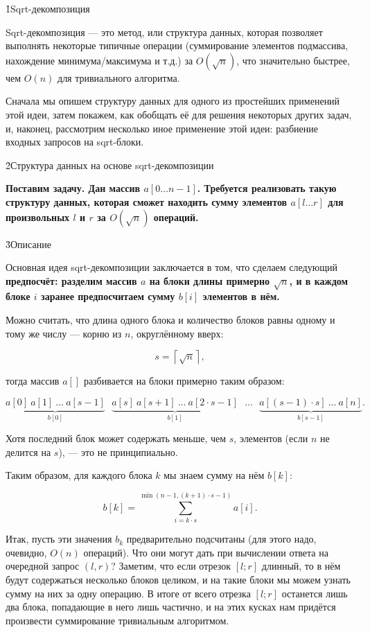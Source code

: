 \h1{Sqrt-декомпозиция}

Sqrt-декомпозиция --- это метод, или структура данных, которая позволяет выполнять некоторые типичные операции (суммирование элементов подмассива, нахождение минимума/максимума и т.д.) за $O(\sqrt{n})$, что значительно быстрее, чем $O(n)$ для тривиального алгоритма.

Сначала мы опишем структуру данных для одного из простейших применений этой идеи, затем покажем, как обобщать её для решения некоторых других задач, и, наконец, рассмотрим несколько иное применение этой идеи: разбиение входных запросов на sqrt-блоки.


\h2{Структура данных на основе sqrt-декомпозиции}

\bf{Поставим задачу}. Дан массив $a[0 \ldots n-1]$. Требуется реализовать такую структуру данных, которая сможет находить сумму элементов $a[l \ldots r]$ для произвольных $l$ и $r$ за $O(\sqrt{n})$ операций.


\h3{Описание}

Основная идея sqrt-декомпозиции заключается в том, что сделаем следующий \bf{предпосчёт}: разделим массив $a$ на блоки длины примерно $\sqrt{n}$, и в каждом блоке $i$ заранее предпосчитаем сумму $b[i]$ элементов в нём.

Можно считать, что длина одного блока и количество блоков равны одному и тому же числу --- корню из $n$, округлённому вверх:

$$ s = \left\lceil \sqrt{n} \right\rceil, $$

тогда массив $a[]$ разбивается на блоки примерно таким образом:

$$ \underbrace{ a[0] ~ a[1] ~ \ldots ~ a[s-1] }_{b[0]} ~~~ \underbrace{ a[s] ~ a[s+1] ~ \ldots ~ a[2 \cdot s-1] }_{b[1]} ~~~ \ldots ~~~ \underbrace{ a[(s-1) \cdot s] ~ \ldots ~ a[n] }_{b[s-1]}. $$

Хотя последний блок может содержать меньше, чем $s$, элементов (если $n$ не делится на $s$), --- это не принципиально.

Таким образом, для каждого блока $k$ мы знаем сумму на нём $b[k]$:

$$ b[k] = \sum_{i=k \cdot s}^{\min (n-1, (k+1) \cdot s - 1)} a[i]. $$

Итак, пусть эти значения $b_k$ предварительно подсчитаны (для этого надо, очевидно, $O(n)$ операций). Что они могут дать при вычислении ответа на очередной запрос $(l,r)$? Заметим, что если отрезок $[l;r]$ длинный, то в нём будут содержаться несколько блоков целиком, и на такие блоки мы можем узнать сумму на них за одну операцию. В итоге от всего отрезка $[l;r]$ останется лишь два блока, попадающие в него лишь частично, и на этих кусках нам придётся произвести суммирование тривиальным алгоритмом.

